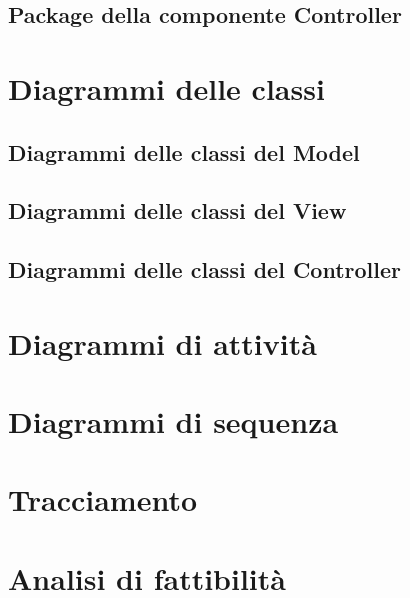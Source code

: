 \documentclass[a4paper,11pt]{article}
\begin{document}
	\subsection{Package della componente Controller}
			
	\section{Diagrammi delle classi}
		\subsection{Diagrammi delle classi del Model}
		\subsection{Diagrammi delle classi del View}
		\subsection{Diagrammi delle classi del Controller}
	\section{Diagrammi di attività}
	\section{Diagrammi di sequenza}
	\section{Tracciamento}
	\section{Analisi di fattibilità}
\end{document}
